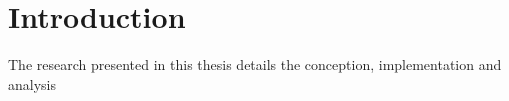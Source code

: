 \section{Introduction}

The research presented in this thesis details the conception, implementation and analysis








